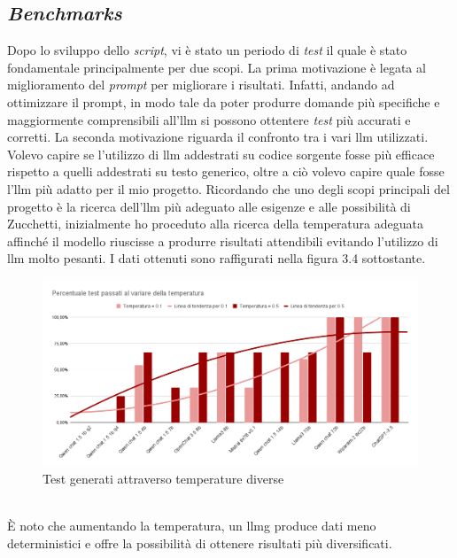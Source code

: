     \subsection{\textit{Benchmarks}}
    Dopo lo sviluppo dello \textit{script}, vi è stato un periodo di \textit{test} il quale è stato fondamentale principalmente per due scopi. 
    La prima motivazione è legata al miglioramento del \textit{prompt} per migliorare i risultati.
    Infatti, andando ad ottimizzare il prompt, in modo tale da poter produrre domande più specifiche e maggiormente comprensibili all'\gls{llm}  si possono ottentere \textit{test} più accurati 
    e corretti. 
    La seconda motivazione riguarda il confronto tra i vari \gls{llm} utilizzati.
    Volevo capire se l'utilizzo di \gls{llm} addestrati su codice sorgente fosse più efficace rispetto a quelli addestrati su testo generico, oltre a ciò volevo capire quale fosse l'\gls{llm} più adatto per il mio progetto.
    Ricordando che uno degli scopi principali del progetto è la ricerca dell’\gls{llm} più adeguato alle esigenze e alle possibilità di Zucchetti, 
    inizialmente ho proceduto alla ricerca della temperatura adeguata affinché il modello riuscisse a produrre risultati attendibili evitando 
    l’utilizzo di \gls{llm} molto pesanti. I dati ottenuti sono raffigurati nella figura 3.4 sottostante.\newpage
    \begin{figure}[!h]
        \centering        
        \includegraphics[width=14.5cm]{img/Percentuale test passati al variare della temperatura.png}
        \caption{Test generati attraverso temperature diverse}
    \end{figure}
    \\È noto che aumentando la temperatura, un \gls{llmg} produce dati meno deterministici e offre la possibilità di ottenere risultati più diversificati.
